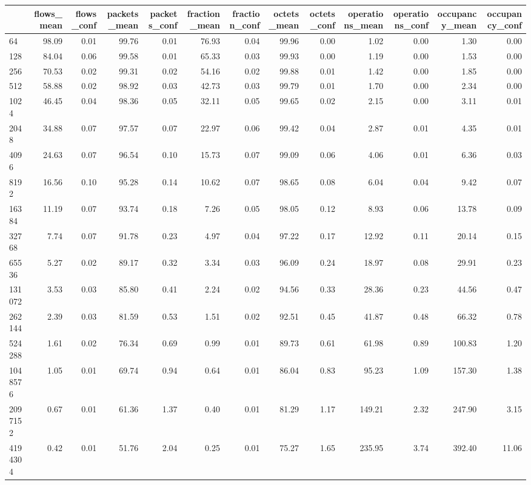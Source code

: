 \begin{tabular}{lrrrrrrrrrrrr}
\toprule
 & flows_mean & flows_conf & packets_mean & packets_conf & fraction_mean & fraction_conf & octets_mean & octets_conf & operations_mean & operations_conf & occupancy_mean & occupancy_conf \\
\midrule
64 & 98.09 & 0.01 & 99.76 & 0.01 & 76.93 & 0.04 & 99.96 & 0.00 & 1.02 & 0.00 & 1.30 & 0.00 \\
128 & 84.04 & 0.06 & 99.58 & 0.01 & 65.33 & 0.03 & 99.93 & 0.00 & 1.19 & 0.00 & 1.53 & 0.00 \\
256 & 70.53 & 0.02 & 99.31 & 0.02 & 54.16 & 0.02 & 99.88 & 0.01 & 1.42 & 0.00 & 1.85 & 0.00 \\
512 & 58.88 & 0.02 & 98.92 & 0.03 & 42.73 & 0.03 & 99.79 & 0.01 & 1.70 & 0.00 & 2.34 & 0.00 \\
1024 & 46.45 & 0.04 & 98.36 & 0.05 & 32.11 & 0.05 & 99.65 & 0.02 & 2.15 & 0.00 & 3.11 & 0.01 \\
2048 & 34.88 & 0.07 & 97.57 & 0.07 & 22.97 & 0.06 & 99.42 & 0.04 & 2.87 & 0.01 & 4.35 & 0.01 \\
4096 & 24.63 & 0.07 & 96.54 & 0.10 & 15.73 & 0.07 & 99.09 & 0.06 & 4.06 & 0.01 & 6.36 & 0.03 \\
8192 & 16.56 & 0.10 & 95.28 & 0.14 & 10.62 & 0.07 & 98.65 & 0.08 & 6.04 & 0.04 & 9.42 & 0.07 \\
16384 & 11.19 & 0.07 & 93.74 & 0.18 & 7.26 & 0.05 & 98.05 & 0.12 & 8.93 & 0.06 & 13.78 & 0.09 \\
32768 & 7.74 & 0.07 & 91.78 & 0.23 & 4.97 & 0.04 & 97.22 & 0.17 & 12.92 & 0.11 & 20.14 & 0.15 \\
65536 & 5.27 & 0.02 & 89.17 & 0.32 & 3.34 & 0.03 & 96.09 & 0.24 & 18.97 & 0.08 & 29.91 & 0.23 \\
131072 & 3.53 & 0.03 & 85.80 & 0.41 & 2.24 & 0.02 & 94.56 & 0.33 & 28.36 & 0.23 & 44.56 & 0.47 \\
262144 & 2.39 & 0.03 & 81.59 & 0.53 & 1.51 & 0.02 & 92.51 & 0.45 & 41.87 & 0.48 & 66.32 & 0.78 \\
524288 & 1.61 & 0.02 & 76.34 & 0.69 & 0.99 & 0.01 & 89.73 & 0.61 & 61.98 & 0.89 & 100.83 & 1.20 \\
1048576 & 1.05 & 0.01 & 69.74 & 0.94 & 0.64 & 0.01 & 86.04 & 0.83 & 95.23 & 1.09 & 157.30 & 1.38 \\
2097152 & 0.67 & 0.01 & 61.36 & 1.37 & 0.40 & 0.01 & 81.29 & 1.17 & 149.21 & 2.32 & 247.90 & 3.15 \\
4194304 & 0.42 & 0.01 & 51.76 & 2.04 & 0.25 & 0.01 & 75.27 & 1.65 & 235.95 & 3.74 & 392.40 & 11.06 \\

\end{tabular}
